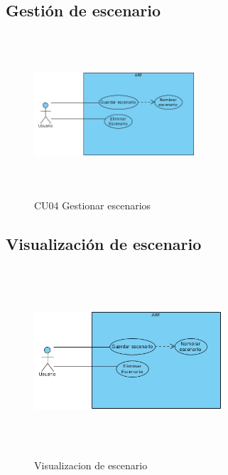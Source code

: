 \subsection{Gestión de escenario} 
\vspace{5mm}
\begin{figure}[h!]
	\centering
	\includegraphics[width=6cm,height=6cm]{imagenes/analisis/Escenario.jpg}
	\caption{CU04 Gestionar escenarios\cite{B27}}
	\label{fig:analogo}
\end{figure}
\newpage

\subsection{Visualización de escenario} 
\vspace{5mm} 
\begin{figure}[h!]
	\centering
	\includegraphics[width=7cm,height=7cm]{imagenes/analisis/Escenario.jpg}
	\caption{Visualizacion de escenario \cite{B27}}
	\label{fig:analogo}
\end{figure}